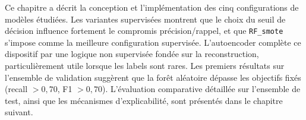 Ce chapitre a décrit la conception et l'implémentation des cinq configurations de modèles
étudiées. Les variantes supervisées montrent que le choix du seuil de décision influence
fortement le compromis précision/rappel, et que \texttt{RF\_smote} s'impose comme la
meilleure configuration supervisée. L'autoencoder complète ce dispositif par une logique
non supervisée fondée sur la reconstruction, particulièrement utile lorsque les labels
sont rares. Les premiers résultats sur l'ensemble de validation suggèrent que la forêt
aléatoire dépasse les objectifs fixés (recall $> 0{,}70$, F1 $> 0{,}70$). L'évaluation
comparative détaillée sur l'ensemble de test, ainsi que les mécanismes d'explicabilité,
sont présentés dans le chapitre suivant.
